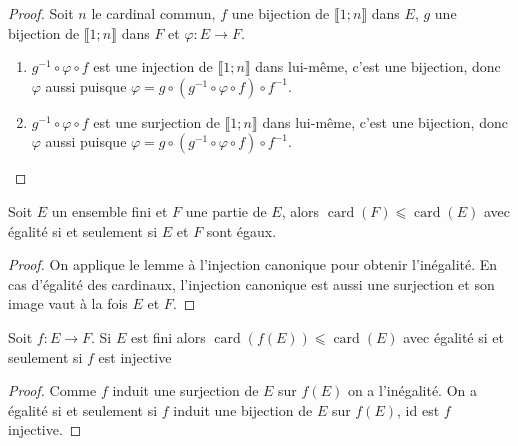 \begin{proof}
Soit \(𝑛\) le cardinal commun, \(𝑓\) une bijection de \(⟦1;𝑛⟧\) dans \(𝐸\), \(𝑔\) une bijection de \(⟦1;𝑛⟧\) dans
\(𝐹\) et \(𝜑:𝐸→𝐹\).
\begin{enumerate}
\item \(𝑔^{-1}∘𝜑∘𝑓\) est une injection de \(⟦1;𝑛⟧\) dans lui-même, c'est une bijection, donc \(𝜑\) aussi puisque
\(𝜑=𝑔∘(𝑔^{-1}∘𝜑∘𝑓)∘𝑓^{-1}\).
\item \(𝑔^{-1}∘𝜑∘𝑓\) est une surjection de \(⟦1;𝑛⟧\) dans lui-même, c'est une bijection, donc \(𝜑\) aussi puisque
\(𝜑=𝑔∘(𝑔^{-1}∘𝜑∘𝑓)∘𝑓^{-1}\).\qedhere
\end{enumerate}
\end{proof}
%
\begin{theorem}
Soit \(𝐸\) un ensemble fini et \(𝐹\) une partie de \(𝐸\), alors \(\operatorname{card}(𝐹)⩽\operatorname{card}(𝐸)\)
avec égalité si et seulement si \(𝐸\) et \(𝐹\) sont égaux.
\end{theorem}
\begin{proof}
On applique le lemme à l'injection canonique pour obtenir l'inégalité. En cas d'égalité des cardinaux, l'injection
canonique est aussi une surjection et son image vaut à la fois \(𝐸\) et \(𝐹\).
\end{proof}
\begin{theorem}
Soit \(𝑓:𝐸→𝐹\). Si \(𝐸\) est fini alors \(\operatorname{card}(𝑓(𝐸))⩽\operatorname{card}(𝐸)\) avec égalité si et
seulement si \(𝑓\) est injective
\end{theorem}
\begin{proof}
Comme \(𝑓\) induit une surjection de \(𝐸\) sur \(𝑓(𝐸)\) on a l'inégalité. On a égalité si et seulement si \(𝑓\)
induit une bijection de \(𝐸\) sur \(𝑓(𝐸)\), id est \(𝑓\) injective.
\end{proof}
